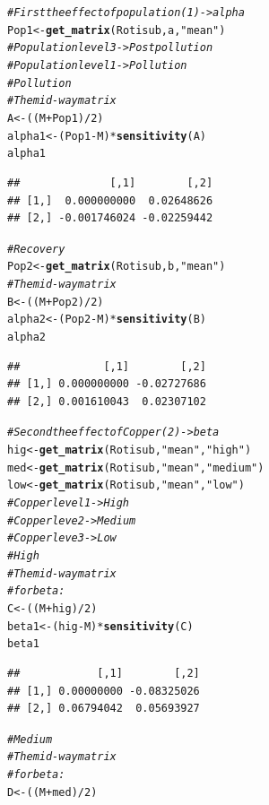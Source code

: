 \documentclass{article}\usepackage[]{graphicx}\usepackage[]{color}
\makeatletter
\newcommand{\hlnum}[1]{\textcolor[rgb]{0.686,0.059,0.569}{#1}}%
\newcommand{\hlstr}[1]{\textcolor[rgb]{0.192,0.494,0.8}{#1}}%
\newcommand{\hlcom}[1]{\textcolor[rgb]{0.678,0.584,0.686}{\textit{#1}}}%
\newcommand{\hlopt}[1]{\textcolor[rgb]{0,0,0}{#1}}%
\newcommand{\hlstd}[1]{\textcolor[rgb]{0.345,0.345,0.345}{#1}}%
\newcommand{\hlkwb}[1]{\textcolor[rgb]{0.69,0.353,0.396}{#1}}%
\newcommand{\hlkwd}[1]{\textcolor[rgb]{0.737,0.353,0.396}{\textbf{#1}}}%
\newenvironment{kframe}{%
 \def\at@end@of@kframe{}%
 \ifinner\ifhmode%
  \def\at@end@of@kframe{\end{minipage}}%
  \begin{minipage}{\columnwidth}%
 \fi\fi%
 \def\FrameCommand##1{\hskip\@totalleftmargin \hskip-\fboxsep
 \colorbox{shadecolor}{##1}\hskip-\fboxsep
     \hskip-\linewidth \hskip-\@totalleftmargin \hskip\columnwidth}%
 \MakeFramed {\advance\hsize-\width
   \@totalleftmargin\z@ \linewidth\hsize
   \@setminipage}}%
 {\par\unskip\endMakeFramed%
 \at@end@of@kframe}
\newenvironment{knitrout}{}{} %
\makeatother
\begin{document}
\begin{knitrout}
\begin{kframe}
\begin{alltt}
\hlcom{#First the effect of population (1)-> alpha}
\hlstd{Pop1}\hlkwb{<-}\hlkwd{get_matrix}\hlstd{(Rotisub, a,} \hlstr{"mean"}\hlstd{)}
\hlcom{#Population level 3->Postpollution}
\hlcom{#Population level 1->Pollution }
     \hlcom{#Pollution}
       \hlcom{#The mid-way matrix }
\hlstd{A}\hlkwb{<-}\hlstd{((M}\hlopt{+}\hlstd{Pop1)}\hlopt{/}\hlnum{2}\hlstd{)}
\hlstd{alpha1}\hlkwb{<-}\hlstd{(Pop1}\hlopt{-}\hlstd{M)}\hlopt{*}\hlkwd{sensitivity}\hlstd{(A)}
\hlstd{alpha1}
\end{alltt}
\begin{verbatim}
##              [,1]        [,2]
## [1,]  0.000000000  0.02648626
## [2,] -0.001746024 -0.02259442
\end{verbatim}
\begin{alltt}
\hlcom{#Recovery}
\hlstd{Pop2}\hlkwb{<-}\hlkwd{get_matrix}\hlstd{(Rotisub, b,} \hlstr{"mean"}\hlstd{)}
       \hlcom{#The mid-way matrix }
\hlstd{B}\hlkwb{<-}\hlstd{((M}\hlopt{+}\hlstd{Pop2)}\hlopt{/}\hlnum{2}\hlstd{)}
\hlstd{alpha2}\hlkwb{<-}\hlstd{(Pop2}\hlopt{-}\hlstd{M)}\hlopt{*}\hlkwd{sensitivity}\hlstd{(B)}
\hlstd{alpha2}
\end{alltt}
\begin{verbatim}
##             [,1]        [,2]
## [1,] 0.000000000 -0.02727686
## [2,] 0.001610043  0.02307102
\end{verbatim}
\begin{alltt}
\hlcom{#Second the effect of Copper (2)-> beta}
\hlstd{hig}\hlkwb{<-}\hlkwd{get_matrix}\hlstd{(Rotisub,} \hlstr{"mean"}\hlstd{,} \hlstr{"high"}\hlstd{)}
\hlstd{med}\hlkwb{<-}\hlkwd{get_matrix}\hlstd{(Rotisub,} \hlstr{"mean"}\hlstd{,} \hlstr{"medium"}\hlstd{)}
\hlstd{low}\hlkwb{<-}\hlkwd{get_matrix}\hlstd{(Rotisub,} \hlstr{"mean"}\hlstd{,} \hlstr{"low"}\hlstd{)}
\hlcom{#Copper level 1->High}
\hlcom{#Copper leve 2->Medium}
\hlcom{#Copper leve 3->Low}
     \hlcom{#High}
       \hlcom{#The mid-way matrix }
\hlcom{#for beta:}
\hlstd{C}\hlkwb{<-}\hlstd{((M}\hlopt{+}\hlstd{hig)}\hlopt{/}\hlnum{2}\hlstd{)}
\hlstd{beta1}\hlkwb{<-}\hlstd{(hig}\hlopt{-}\hlstd{M)}\hlopt{*}\hlkwd{sensitivity}\hlstd{(C)}
\hlstd{beta1}
\end{alltt}
\begin{verbatim}
##            [,1]        [,2]
## [1,] 0.00000000 -0.08325026
## [2,] 0.06794042  0.05693927
\end{verbatim}
\begin{alltt}
  \hlcom{#Medium}
       \hlcom{#The mid-way matrix }
\hlcom{#for beta:}
\hlstd{D}\hlkwb{<-}\hlstd{((M}\hlopt{+}\hlstd{med)}\hlopt{/}\hlnum{2}\hlstd{)}


\end{alltt}
\end{kframe}
\end{knitrout}
\end{document}
